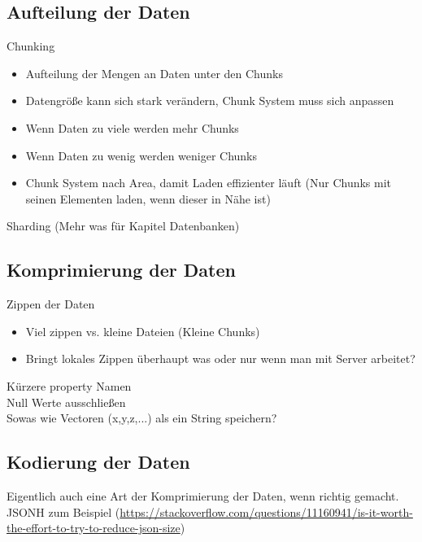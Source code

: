 \subsection{Aufteilung der Daten}
Chunking\\
\begin{itemize}
    \item Aufteilung der Mengen an Daten unter den Chunks
    \item Datengröße kann sich stark verändern, Chunk System muss sich anpassen
    \item Wenn Daten zu viele werden mehr Chunks
    \item Wenn Daten zu wenig werden weniger Chunks
    \item Chunk System nach Area, damit Laden effizienter läuft 
    (Nur Chunks mit seinen Elementen laden, wenn dieser in Nähe ist)
\end{itemize}

Sharding (Mehr was für Kapitel Datenbanken)


\subsection{Komprimierung der Daten}
Zippen der Daten\\
\begin{itemize}
    \item Viel zippen vs. kleine Dateien (Kleine Chunks)
    \item Bringt lokales Zippen überhaupt was oder nur wenn man mit Server arbeitet?
\end{itemize}

Kürzere property Namen\\
Null Werte ausschließen\\
Sowas wie Vectoren (x,y,z,...) als ein String speichern?


\subsection{Kodierung der Daten}
Eigentlich auch eine Art der Komprimierung der Daten, wenn richtig gemacht.\\
JSONH zum Beispiel (\url{https://stackoverflow.com/questions/11160941/is-it-worth-the-effort-to-try-to-reduce-json-size})

